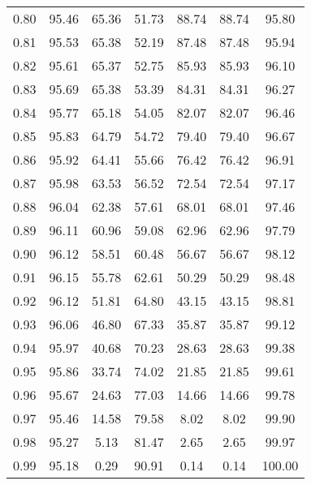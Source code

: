\begin{tabular}{|c|c|c|c|c|c|c|}
      0.80 &     95.46 &     65.36 &      51.73 &   88.74 &      88.74 &         95.80 \\
      0.81 &     95.53 &     65.38 &      52.19 &   87.48 &      87.48 &         95.94 \\
      0.82 &     95.61 &     65.37 &      52.75 &   85.93 &      85.93 &         96.10 \\
      0.83 &     95.69 &     65.38 &      53.39 &   84.31 &      84.31 &         96.27 \\
      0.84 &     95.77 &     65.18 &      54.05 &   82.07 &      82.07 &         96.46 \\
      0.85 &     95.83 &     64.79 &      54.72 &   79.40 &      79.40 &         96.67 \\
      0.86 &     95.92 &     64.41 &      55.66 &   76.42 &      76.42 &         96.91 \\
      0.87 &     95.98 &     63.53 &      56.52 &   72.54 &      72.54 &         97.17 \\
      0.88 &     96.04 &     62.38 &      57.61 &   68.01 &      68.01 &         97.46 \\
      0.89 &     96.11 &     60.96 &      59.08 &   62.96 &      62.96 &         97.79 \\
      0.90 &     96.12 &     58.51 &      60.48 &   56.67 &      56.67 &         98.12 \\
      0.91 &     96.15 &     55.78 &      62.61 &   50.29 &      50.29 &         98.48 \\
      0.92 &     96.12 &     51.81 &      64.80 &   43.15 &      43.15 &         98.81 \\
      0.93 &     96.06 &     46.80 &      67.33 &   35.87 &      35.87 &         99.12 \\
      0.94 &     95.97 &     40.68 &      70.23 &   28.63 &      28.63 &         99.38 \\
      0.95 &     95.86 &     33.74 &      74.02 &   21.85 &      21.85 &         99.61 \\
      0.96 &     95.67 &     24.63 &      77.03 &   14.66 &      14.66 &         99.78 \\
      0.97 &     95.46 &     14.58 &      79.58 &    8.02 &       8.02 &         99.90 \\
      0.98 &     95.27 &      5.13 &      81.47 &    2.65 &       2.65 &         99.97 \\
      0.99 &     95.18 &      0.29 &      90.91 &    0.14 &       0.14 &        100.00 \\
\bottomrule
\end{tabular}

